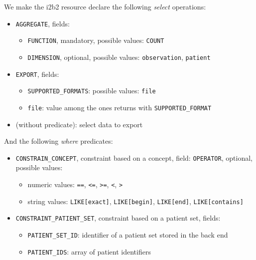We make the i2b2 resource declare the following \emph{select} operations:
\begin{itemize}
    \item \verb|AGGREGATE|, fields:
    \begin{itemize}
        \item \verb|FUNCTION|, mandatory, possible values:
        \verb|COUNT|
        
        \item \verb|DIMENSION|, optional, possible values:
        \verb|observation|,
        \verb|patient|
    \end{itemize}
    
    \item \verb|EXPORT|, fields:
    \begin{itemize}
        \item \verb|SUPPORTED_FORMATS|: possible values: \verb|file| %
        \item \verb|file|: value among the ones returns with \verb|SUPPORTED_FORMAT|
    \end{itemize}
    
    \item (without predicate): select data to export
\end{itemize}

And the following \emph{where} predicates:
\begin{itemize}
    \item \verb|CONSTRAIN_CONCEPT|, constraint based on a concept, field:
    \verb|OPERATOR|, optional, possible values:
    \begin{itemize}
        \item numeric values: \verb|==|, \verb|<=|, \verb|>=|, \verb|<|, \verb|>|
        \item string values: \verb|LIKE[exact]|, \verb|LIKE[begin]|, \verb|LIKE[end]|, \verb|LIKE[contains]|
    \end{itemize}
    
    \item \verb|CONSTRAINT_PATIENT_SET|, constraint based on a patient set, fields:
    \begin{itemize}
        \item \verb|PATIENT_SET_ID|: identifier of a patient set stored in the back end
        \item \verb|PATIENT_IDS|: array of patient identifiers
    \end{itemize}
\end{itemize}

